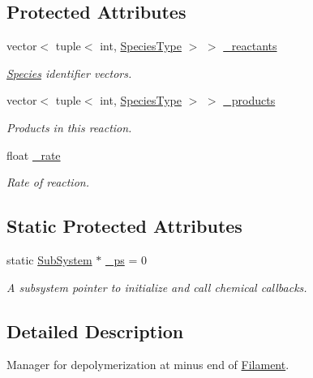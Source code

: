\subsection*{Protected Attributes}
\begin{DoxyCompactItemize}
\item 
vector$<$ tuple$<$ int, \hyperlink{Species_8h_a50651af47c56ea0e27235468d23542cf}{Species\+Type} $>$ $>$ \hyperlink{classInternalFilamentRxnManager_a63de9061c3da4ad03cf4c530d2774979}{\+\_\+reactants}
\begin{DoxyCompactList}\small\item\em \hyperlink{classSpecies}{Species} identifier vectors. \end{DoxyCompactList}\item 
vector$<$ tuple$<$ int, \hyperlink{Species_8h_a50651af47c56ea0e27235468d23542cf}{Species\+Type} $>$ $>$ \hyperlink{classInternalFilamentRxnManager_afd213da1a3706e2e88962e5da886a5dc}{\+\_\+products}
\begin{DoxyCompactList}\small\item\em Products in this reaction. \end{DoxyCompactList}\item 
float \hyperlink{classInternalFilamentRxnManager_a8b98dd9e6f5d016149f5434b891806df}{\+\_\+rate}
\begin{DoxyCompactList}\small\item\em Rate of reaction. \end{DoxyCompactList}\end{DoxyCompactItemize}
\subsection*{Static Protected Attributes}
\begin{DoxyCompactItemize}
\item 
static \hyperlink{classSubSystem}{Sub\+System} $\ast$ \hyperlink{classInternalFilamentRxnManager_a973ce9cc2aae811e6867afa46193c5f2}{\+\_\+ps} = 0
\begin{DoxyCompactList}\small\item\em A subsystem pointer to initialize and call chemical callbacks. \end{DoxyCompactList}\end{DoxyCompactItemize}


\subsection{Detailed Description}
Manager for depolymerization at minus end of \hyperlink{classFilament}{Filament}. 

